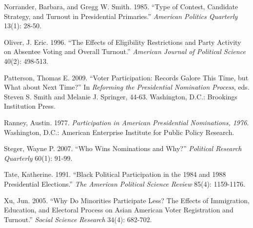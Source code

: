 \documentclass[12pt]{article}
\begin{document}
\begin{doublespace}
\begin{hangparas}{.25in}{1}
			Norrander, Barbara, and Gregg W. Smith. 1985. “Type of Contest, Candidate Strategy, and Turnout in Presidential Primaries.” \textit{American Politics Quarterly} 13(1): 28-50.
			
			Oliver, J. Eric. 1996. “The Effects of Eligibility Restrictions and Party Activity on Absentee Voting and Overall Turnout.” \textit{American Journal of Political Science} 40(2): 498-513. 
		
			Patterson, Thomas E. 2009. 	“Voter Participation: Records Galore This Time, but What about Next Time?” In \textit{Reforming the Presidential Nomination Process}, eds. Steven S. Smith and Melanie J. Springer, 44-63. Washington, D.C.: Brookings Institution Press. 
		
			Ranney, Austin. 1977. \textit{Participation in American Presidential Nominations, 1976}. Washington, D.C.: American Enterprise Institute for Public Policy Research. 
			
			Steger, Wayne P. 2007. “Who Wins Nominations and Why?” \textit{Political Research Quarterly} 60(1): 91-99. 
		
			Tate, Katherine. 1991. “Black Political Participation in the 1984 and 1988 Presidential Elections.” \textit{The American Political Science Review} 85(4): 1159-1176. 
			
			Xu, Jun. 2005. “Why Do Minorities Participate Less? The Effects of Immigration, Education, and Electoral Process on Asian American Voter Registration and Turnout.” \textit{Social Science Research} 34(4): 682-702.
		\end{hangparas}
\end{doublespace}



		
\end{document}
